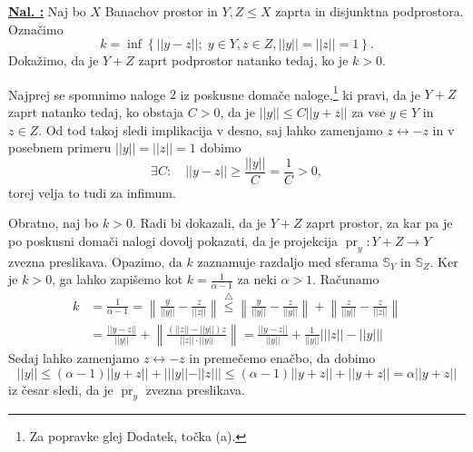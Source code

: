 \documentclass[a4paper, 12pt]{article}
\DeclareMathOperator{\pr}{pr}
\renewcommand{\S}{\mathbb{S}}
\newcommand{\idtfy}{\longleftrightarrow}
\newcounter{excounter}[section]
\newenvironment{Exercise}
    {\refstepcounter{excounter}\underline{\textbf{Nal. \theexcounter:}}}
    {\par\vspace{\baselineskip}}
\begin{document}
\begin{Exercise}
    Naj bo $X$ Banachov prostor in $Y,Z \leq X$ zaprta in disjunktna podprostora.
    Označimo
    \[
        k = \inf\left\{ ||y - z|| ; \; y \in Y, z \in Z, ||y|| = ||z|| = 1 \right\}.
    \]
    Dokažimo, da je $Y + Z$ zaprt podprostor natanko tedaj, ko je $k > 0$.

    Najprej se spomnimo naloge $2$ iz poskusne domače naloge,\footnote{
        Za popravke glej Dodatek, točka (a).}
    ki pravi, da je $Y + Z$ zaprt natanko tedaj, ko obstaja $C > 0$,
    da je $ || y || \leq C || y + z ||$ za vse $y \in Y$ in $z \in Z$.
    Od tod takoj sledi implikacija v desno, saj lahko zamenjamo $z \idtfy -z$
    in v posebnem primeru $|| y || = || z || = 1$ dobimo
    \[
        \exists C \colon \quad || y - z || \geq \frac{||y||}{C} = \frac{1}{C} > 0,
    \]
    torej velja to tudi za infimum.

    Obratno, naj bo $k > 0$.
    Radi bi dokazali, da je $Y + Z$ zaprt prostor,
    za kar pa je po poskusni domači nalogi dovolj pokazati,
    da je projekcija $\pr_y \colon Y+Z \to Y$ zvezna preslikava.
    Opazimo, da $k$ zaznamuje razdaljo med sferama $\S_Y$ in $\S_Z$.
    Ker je $k > 0$, ga lahko zapišemo kot $k = \frac{1}{\alpha - 1}$ za neki $\alpha > 1$.
    Računamo
    \begin{align*}
        k &= \frac{1}{ \alpha - 1}
        = \left\| \frac{y}{||y||} - \frac{z}{||z||} \right\|  
        \stackrel{\triangle}{\leq} \left\| \frac{y}{||y||} - \frac{z}{||y||} \right\| + \left\| \frac{z}{||y||} - \frac{z}{||z||} \right\| \\
        &= \frac{||y-z||}{||y||} + \left\| \frac{(||z|| - ||y||)z}{||z||\cdot||y||} \right\|
        = \frac{||y-z||}{||y||} + \frac{1}{||y||} \left| ||z|| - ||y|| \right|
    \end{align*}
    Sedaj lahko zamenjamo $z \idtfy -z$ in premečemo enačbo, da dobimo
    \[
        ||y|| \leq (\alpha - 1) ||y + z|| + | ||y|| - ||z|| |
        \leq (\alpha - 1) ||y+z|| + ||y+z||
        = \alpha ||y+z||
    \]
    iz česar sledi, da je $ \pr_y$ zvezna preslikava.
\end{Exercise}
\end{document}
